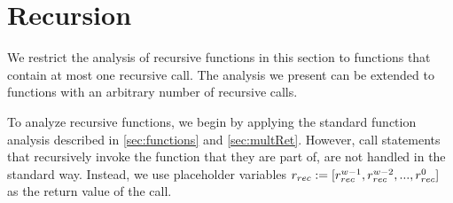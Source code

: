 \section{Recursion}
We restrict the analysis of recursive functions in this section to functions that contain at most one recursive call. The analysis we present can be extended to functions with an arbitrary number of recursive calls.

To analyze recursive functions, we begin by applying the standard function analysis described in \ref{sec:functions} and \ref{sec:multRet}. However, call statements that recursively invoke the function that they are part of, are not handled in the standard way. Instead, we use placeholder variables $r_{rec} := [r_{rec}^{w - 1}, r_{rec}^{w - 2}, ..., r_{rec}^0]$ as the return value of the call.

\iffalse
\begin{figure}
\centering
    \begin{subfigure}{.5\textwidth}
        \centering
    \begin{algorithm}[H]
        \hspace*{\algorithmicindent} \textbf{Input} $\mIn: int$ \\
        \hspace*{\algorithmicindent} \textbf{Output} $\mOut: int$\\
        \begin{algorithmic}[1]
            \State $\mOut \leftarrow $ \textsc{sumRec}$(\mIn, 0)$
            \vspace{1em}
            \Procedure{sumRec}{$x: int, \: y: int$}: int
            \If{$x == 0$}
                \State $z_0: int \leftarrow y$ 
                \Else
                \State $z_1: int \leftarrow$ \textsc{sumRec}$(x - 1, y + 1)$
            \EndIf
            \State $z_2 \leftarrow \phi(z_0, z_1)$
            \State \Return $z_2$
            \EndProcedure
        \end{algorithmic} 
    \end{algorithm}
    \caption{A program containing a recursive function. The recursive function takes two arguments and adds their values together.}\label{fig:rec}
    \end{subfigure}
    \hfill
    \begin{subfigure}{.45\textwidth}
    \centering
        \begin{align*}
    dVec(x) := & [x^2 x^1 x^0] \\
    dVec(y) := & [y^2 y^1 x^0] \\
    dVec(z_0) := & [y^2 y^1 y^0] \\
    dVec(z_1) := & \bot \\
    dVec(z_2) := & \mathbb{IF}([x^2 x^1 x^0] == [000]), \\
    & \: [y^2 y^1 y^0], \: \bot)
\end{align*}
    \caption{Dependency vectors for the values in \textsc{sumRec}$(\cdot, \cdot)$}
    \end{subfigure}
    \caption{Example demonstrating the analysis of recursive functions}\label{fig:rec}
\end{figure}
\fi

